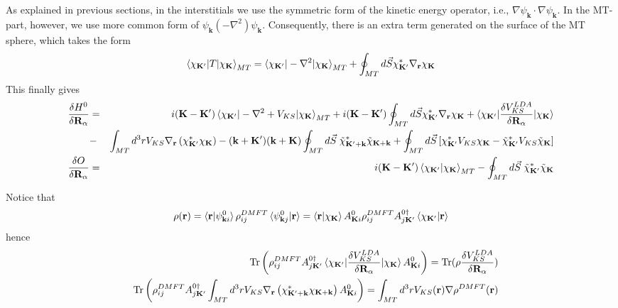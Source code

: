\documentclass[aps,prb,floatfix,epsfig,singlecolumn,showpacs,preprintnumbers]{revtex4}
\newcommand{\vR}{{\mathbf{R}}}
\renewcommand{\vr}{{\mathbf{r}}}
\newcommand{\vk}{{\mathbf{k}}}
\newcommand{\vK}{{\mathbf{K}}}
\newcommand{\Tr}{\mathrm{Tr}}
\begin{document}
As explained in previous sections, in the interstitials we use the
symmetric form of the kinetic energy operator, i.e., $\nabla \psi_\vk \cdot
\nabla\psi_\vk$. In the MT-part, however, we use more common form
of $\psi_\vk (-\nabla^2)\psi_\vk$. Consequently, there is an extra
term generated on the surface of the MT sphere, which takes the form
\begin{eqnarray}
\braket{\chi_{\vK'}|T|\chi_\vK}_{MT} =  \braket{\chi_{\vK'}|-\nabla^2|\chi_\vK}_{MT} 
+\oint_{MT} d\vec{S}\chi_{\vK'}^* \nabla_\vr \chi_{\vK}
\end{eqnarray}
This finally gives
\begin{eqnarray}
\frac{\delta H^0}{\delta\vR_\alpha}&=&
i(\vK-\vK')\braket{\chi_{\vK'}|-\nabla^2+V_{KS}|\chi_{\vK}}_{MT}
+i(\vK-\vK') \oint_{MT} d\vec{S}\chi_{\vK'}^* \nabla_\vr \chi_{\vK}
+\braket{\chi_{\vK'}|\frac{\delta V_{KS}^{LDA}}{\delta\vR_\alpha}|\chi_{\vK}}
\\
&-&\int_{MT} d^3r V_{KS} \nabla_\vr \left( \chi^*_{\vK'} \chi_{\vK}  \right)
-(\vk+\vK')(\vk+\vK)\oint_{MT}d\vec{S}\;\tilde{\chi}^*_{\vK'+\vk} \tilde{\chi}_{\vK+\vk}
+\oint_{MT} d\vec{S} \left[\chi^*_{\vK'} V_{KS} \chi_{\vK}-\tilde{\chi}^*_{\vK'} V_{KS} \tilde{\chi}_{\vK}\right]
\nonumber\\
\frac{\delta O}{\delta\vR_\alpha} &=&
 i(\vK-\vK')\braket{\chi_{\vK'}|\chi_{\vK}}_{MT}-\oint_{MT} d\vec{S}\;\tilde{\chi}^*_{\vK'}\tilde{\chi}_{\vK}
\end{eqnarray}

Notice that 
\begin{equation}
\rho(\vr) = \braket{\vr|\psi^0_{\vk i}}\rho^{DMFT}_{ij}\braket{\psi^0_{\vk  j}|\vr}= 
\braket{\vr|\chi_{\vK}} A^{0}_{\vK i}  \rho_{ij}^{DMFT}A^{0\dagger}_{j\vK'} \braket{\chi_{\vK'}|\vr}
\end{equation}
hence
\begin{eqnarray}
&& \Tr\left( \rho^{DMFT}_{ij} A^{0\dagger}_{j\vK'}  \braket{\chi_{\vK'}|\frac{\delta V_{KS}^{LDA}}{\delta\vR_\alpha}  |\chi_{\vK}} A^0_{\vK i} \right)=\Tr(\rho \frac{\delta V_{KS}^{LDA}}{\delta\vR_\alpha} )\\
&& \Tr\left( \rho^{DMFT}_{ij} A^{0\dagger}_{j\vK'}  
\int_{MT} d^3r V_{KS} \nabla_\vr \left( \chi^*_{\vK'+\vk} \chi_{\vK+\vk}  \right)
A^0_{\vK i} \right)=\int_{MT} d^3r V_{KS}(\vr)\nabla\rho^{DMFT}(\vr)
\end{eqnarray}
\end{document}
